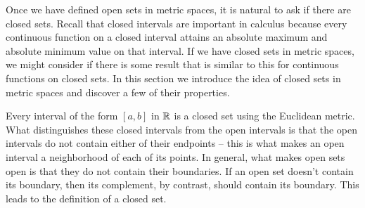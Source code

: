 \label{sec:closed_sets}

\vspace*{-17 pt}

\vspace*{13 pt}

Once we have defined open sets in metric spaces, it is natural to ask if there are closed sets. Recall that closed intervals are important in calculus because every continuous function on a closed interval attains an absolute maximum and absolute minimum value on that interval. If we have closed sets in metric spaces, we might consider if there is some result that is similar to this for continuous functions on closed sets. In this section we introduce the idea of closed sets in metric spaces and discover a few of their properties. 

Every interval of the form $[a,b]$ in $\mathbb{R}$ is a closed set using the Euclidean metric. What distinguishes these closed intervals from the open intervals is that the open intervals do not contain either of their endpoints -- this is what makes an open interval a neighborhood of each of its points. In general, what makes open sets open is that they do not contain their boundaries. If an open set doesn't contain its boundary, then its complement, by contrast, should contain its boundary. This leads to the definition of a closed set. 

